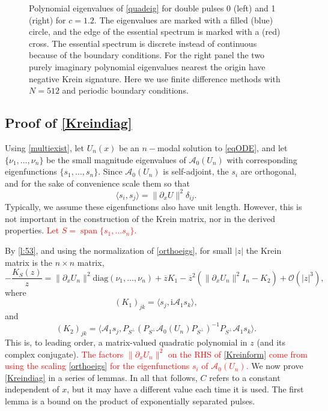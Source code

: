 \documentclass[review,onefignum,onetabnum]{siamart171218}
\newcommand{\R}{\mathbb{R}}
\def\Span{\mathop\mathrm{span}\nolimits}
\newcommand{\rmi}{\mathrm{i}}
\newcommand{\calA}{\mathcal{A}}
\newcommand{\vI}{\bm{\mathit{I}}}
\newcommand{\vK}{\bm{\mathit{K}}}
\newcommand{\revised}[1]{ \textcolor{red}{#1} }
\begin{document}
\begin{figure}[ht]
\begin{tabular}{cc}
\end{tabular}
\caption{Polynomial eigenvalues of \cref{quadeig} for double pulses 0 (left) and 1 (right) for $c=1.2$. The eigenvalues are marked with a filled (blue) circle, and the edge of the essential spectrum is marked with a (red) cross. The essential spectrum is discrete instead of continuous because of the boundary conditions. For the right panel the two purely imaginary polynomial eigenvalues nearest the origin have negative Krein signature. Here we use finite difference methods with $N = 512$ and periodic boundary conditions.}
\label{fig:quadeigdouble}
\end{figure}

\subsection{Proof of \cref{Kreindiag}}\label{s:kreinproof}

Using \cref{multiexist}, let $U_n(x)$ be an $n-$modal solution to \cref{eqODE}, and let $\{\nu_1, \dots, \nu_n\}$ be the small magnitude eigenvalues of $\calA_0(U_n)$ with corresponding eigenfunctions $\{ s_1, \dots, s_n \}$. Since $\calA_0(U_n)$ is self-adjoint, the $s_i$ are orthogonal, and for the sake of convenience scale them so that
\begin{equation}\label{orthoeigs}
\langle s_i, s_j \rangle = \|\partial_x U \|^2 \delta_{ij}.
\end{equation}
Typically, we assume these eigenfunctions also have unit length. However, this is not important in the construction of the Krein matrix, nor in the derived properties.
\revised{
Let $S = \Span\{s_1, \dots s_n\}$.
}

By \cref{l:53}, and using the normalization of \cref{orthoeigs}, for small $|z|$ the Krein matrix is the $n \times n$ matrix,
\begin{equation}\label{Kreinform}
-\frac{\vK_S(z)}{z} = \|\partial_xU_n\|^2 \text{diag}(\nu_1, \dots, \nu_n) + \overline{z}\vK_1
- \overline{z}^2 ( \|\partial_xU_n\|^2\vI_n - \vK_2) + \mathcal{O}(|z|^3),
\end{equation}
where
\begin{equation}\label{defK1}
(\vK_1)_{jk} = \langle s_j, \rmi\calA_1 s_k \rangle,
\end{equation}
and
\begin{equation}\label{defK2}
(\vK_2)_{jk} = \langle \calA_1 s_j, P_{S^\perp}(P_{S^\perp} \calA_0(U_n)P_{S^\perp})^{-1} P_{S^\perp}\calA_1 s_k \rangle.
\end{equation}
This is, to leading order, a matrix-valued quadratic polynomial in $z$ (and its complex conjugate). %
\revised{
The factors $\|\partial_xU_n\|^2$ on the RHS of \cref{Kreinform} come from using the scaling \cref{orthoeigs} for the eigenfunctions $s_i$ of $\calA_0(U_n)$.
}
We now prove \cref{Kreindiag} in a series of lemmas. In all that follows, $C$ refers to a constant independent of $x$, but it may have a different value each time it is used. The first lemma is a bound on the product of exponentially separated pulses.
\end{document}
